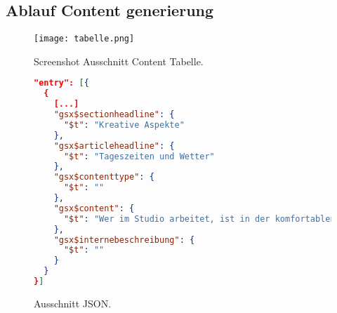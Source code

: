 
\usepackage{listings,xcolor}

 \lstset{language=HTML}



\subsection{Ablauf Content generierung}

\begin{figure}[htb]
\begin{minipage}[b]{1.0\linewidth}
  \centering
\centerline{\texttt{[image: tabelle.png]}}
\end{minipage}
\caption{Screenshot Ausschnitt Content Tabelle.}
\label{fig:res}
\end{figure}

\begin{figure}[htb]
\begin{minipage}[b]{1.0\linewidth}
\begin{lstlisting}[language=json,firstnumber=1]
"entry": [{
  {
    [...]
    "gsx$sectionheadline": {
      "$t": "Kreative Aspekte"
    },
    "gsx$articleheadline": {
      "$t": "Tageszeiten und Wetter"
    },
    "gsx$contenttype": {
      "$t": ""
    },
    "gsx$content": {
      "$t": "Wer im Studio arbeitet, ist in der komfortablen Situation, sich nicht nach der Lichtsituation richten zu m\"ussen. Wer aber Natur-, Sport- oder Eventfotografie betreiben will, kommt um Basiswissen \"uber die Sonne und ihre Auswirkungen nicht herum."
    },
    "gsx$internebeschreibung": {
      "$t": ""
    }
  }
}]
\end{lstlisting}

\end{minipage}
\caption{Ausschnitt JSON.}
\label{fig:res}
\end{figure}


